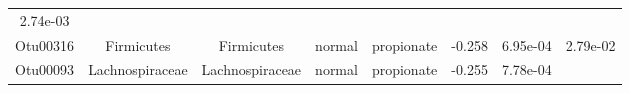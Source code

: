 \documentclass[11pt,]{article}
\begin{document}
\begin{longtable}[]{@{}cccccccc@{}}
\begin{minipage}[t]{0.08\columnwidth}
2.74e-03\strut
\end{minipage}\tabularnewline
\begin{minipage}[t]{0.08\columnwidth}\centering\strut
Otu00316\strut
\end{minipage} & \begin{minipage}[t]{0.15\columnwidth}\centering\strut
Firmicutes\strut
\end{minipage} & \begin{minipage}[t]{0.15\columnwidth}\centering\strut
Firmicutes\strut
\end{minipage} & \begin{minipage}[t]{0.08\columnwidth}\centering\strut
normal\strut
\end{minipage} & \begin{minipage}[t]{0.09\columnwidth}\centering\strut
propionate\strut
\end{minipage} & \begin{minipage}[t]{0.07\columnwidth}\centering\strut
-0.258\strut
\end{minipage} & \begin{minipage}[t]{0.08\columnwidth}\centering\strut
6.95e-04\strut
\end{minipage} & \begin{minipage}[t]{0.08\columnwidth}\centering\strut
2.79e-02\strut
\end{minipage}\tabularnewline
\begin{minipage}[t]{0.08\columnwidth}\centering\strut
Otu00093\strut
\end{minipage} & \begin{minipage}[t]{0.15\columnwidth}\centering\strut
Lachnospiraceae\strut
\end{minipage} & \begin{minipage}[t]{0.15\columnwidth}\centering\strut
Lachnospiraceae\strut
\end{minipage} & \begin{minipage}[t]{0.08\columnwidth}\centering\strut
normal\strut
\end{minipage} & \begin{minipage}[t]{0.09\columnwidth}\centering\strut
propionate\strut
\end{minipage} & \begin{minipage}[t]{0.07\columnwidth}\centering\strut
-0.255\strut
\end{minipage} & \begin{minipage}[t]{0.08\columnwidth}\centering\strut
7.78e-04\strut
\end{minipage} & \begin{minipage}[t]{0.08\columnwidth}\centering\strut

\end{minipage}
\end{longtable}
\end{document}
